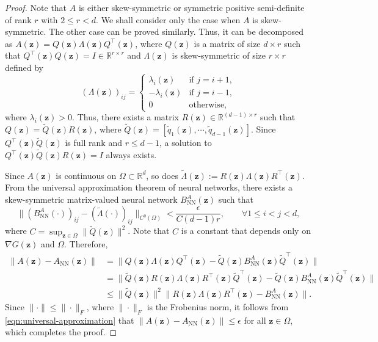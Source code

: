 \documentclass[openacc]{rsproca_new}%
\newcommand{\z}{\bm{z}}
\begin{document}
\begin{proof}
    Note that $A$ is either 
    skew-symmetric 
    or symmetric positive semi-definite
    of rank $r$ with $2 \le r < d$. 
    We shall consider only the case when
    $A$ is skew-symmetric. 
    The other case can be proved similarly. 
    Thus, it can be decomposed as 
    $A(\z) = Q(\z)\Lambda(\z)Q^\top(\z)$,
    where $Q(\z)$ is a matrix of size $d\times r$ such that $Q^\top(\z) Q(\z) = I \in \mathbb{R}^{r\times r}$
    and  $\Lambda(\z)$ is skew-symmetric of size $r\times r$ defined by
    \begin{equation*}
        (\Lambda(\z))_{ij} = \begin{cases}
        \lambda_i(\z) & \text{if }  j = i+1, \\
        -\lambda_i(\z) & \text{if } j = i-1, \\
        0 & \text{otherwise},
        \end{cases}
    \end{equation*}
    where $\lambda_i(\z) > 0$.
    Thus, there exists a matrix $R(\z) \in \mathbb{R}^{(d-1)\times r}$ such that 
    $Q(\z) = \tilde{Q}(\z)R(\z)$,
    where $\tilde{Q}(\z) = [\tilde{q}_1(\z), \cdots, \tilde{q}_{d-1}(\z)]$.
    Since $Q^\top(\z) \tilde{Q}(\z)$ is full rank and $r \le d-1$,
    a solution to $Q^\top(\z) \tilde{Q}(\z) R(\z) = I$ always exists.
    
    Since $A(\z)$ is continuous on $\Omega \subset \mathbb{R}^d$,
    so does $\tilde{\Lambda}(\z):=R(\z)\Lambda(\z)R^\top(\z)$. 
    From the universal approximation theorem of 
    neural networks, 
    there exists
    a skew-symmetric matrix-valued neural network
    $B_\text{NN}^A(\z)$ such that 
    \begin{equation} \label{eqn:universal-approximation}
        \|(B_\text{NN}^A(\cdot))_{ij} - (\tilde{\Lambda}(\cdot))_{ij}\|_{C^0(\Omega)} < \frac{\epsilon}{C(d-1)r},
        \qquad \forall 1\le i < j < d,
    \end{equation}
    where $C = \sup_{\z \in \Omega} \|\tilde{Q}(\z)\|^2$.
    Note that $C$ is a constant that depends only on $\nabla G(\z)$ and $\Omega$.
    Therefore,
    \begin{align*}
        \|A(\z) - A_{\text{NN}}(\z)\|
        &= 
        \|Q(\z)\Lambda(\z)Q^\top(\z) - \tilde{Q}(\z)B_\text{NN}^A(\z)\tilde{Q}^\top(\z)\| \\
        &=
        \|\tilde{Q}(\z)R(\z)\Lambda(\z)R^\top(\z)\tilde{Q}^\top(\z) - \tilde{Q}(\z)B_\text{NN}^A(\z)\tilde{Q}^\top(\z)\| \\
        &\le \|\tilde{Q}(\z)\|^2 \|R(\z)\Lambda(\z)R^\top(\z) - B_\text{NN}^A(\z)\|.
    \end{align*}
    Since $\|\cdot\| \le \|\cdot\|_{F}$,
    where $\|\cdot\|_F$ is the Frobenius norm,
    it follows from \eqref{eqn:universal-approximation} that 
    $\|A(\z) - A_{\text{NN}}(\z)\| \le \epsilon$ for all $\z \in \Omega$, 
    which completes the proof.
\end{proof}
\end{document}
